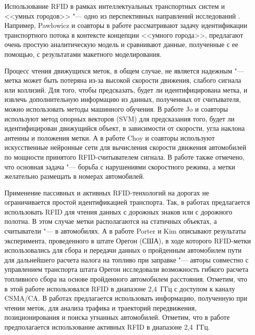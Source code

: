 Использование RFID в рамках интеллектуальных транспортных систем и <<умных городов>> "--- одно из перспективных направлений исследований \cite{Pawowicz2020, Pandit2009, Sundar2015}. Например, Pawłowicz и соавторы в работе \cite{Pawowicz2020} рассматривают задачу идентификации транспортного потока в контексте концепции <<умного города>>, предлагают очень простую аналитическую модель и сравнивают данные, полученные с ее помощью, с результатами макетного моделирования.

Процесс чтения движущихся меток, в общем случае, не является надежным "--- метка может быть потеряна из-за высокой скорости движения, слабого сигнала или коллизий. Для того, чтобы предсказать, будет ли идентифицирована метка, и извлечь дополнительную информацию из данных, полученных от считывателя, можно использовать методы машинного обучения. В работе \cite{Jo2009} Jo и соавторы используют метод опорных векторов (SVM) для предсказания того, будет ли идентифицирован движущийся объект, в зависимости от скорости, угла наклона антенны и положения метки. А в работе \cite{Choy2020} Choy и соавторы используют искусственные нейронные сети для вычисления скорости движения автомобилей по мощности принятого RFID-считывателем сигнала. В работе также отмечено, что основная задача "--- борьба с нарушениями скоростного режима, а метки желательно размещать в номерах автомобилей.

Применение пассивных и активных RFID-тенхологий на дорогах не ограничивается простой идентификацией транспорта. Так, в работах \cite{GarciaOya2018, Jing2016, Hidalgo2013, Jing2013, Cheng2012, Perez2010} предлагается использовать RFID для чтения данных с дорожных знаков или с дорожного полотна. В этом случае метки располагаются на статичных объектах, а считыватели "--- в автомобилях. А в работе \cite{Porter2008} Porter и Kim описывают результаты эксперимента, проведенного в штате Орегон (США), в ходе которого RFID-метки использовались для сбора и передачи данных о пройденным автомобилем пути для дальнейшего расчета налога на топливо при заправке "--- авторы совместно с управлением транспорта штата Орегон исследовали возможность гибкого расчета топливного сбора на основе пройденного автомобилем расстояния. Отметим, что в этой работе использовался RFID в диапазоне 2,4~ГГц с доступом к каналу CSMA/CA. В работах \cite{Zheng2020, HongziZhu2009, Pandit2009} предлагается использовать информацию, полученную при чтении меток, для анализа трафика и траекторий передвижения, позиционирования и поиска угнанных автомобилей. Отметим, что в работе \cite{HongziZhu2009} предполагается использование активных RFID в диапазоне 2,4~ГГц.

